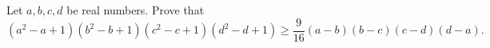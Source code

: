 Let $a,b,c,d$ be real numbers. Prove that
$$(a^2-a+1)(b^2-b+1)(c^2-c+1)(d^2-d+1) \ge \frac{9}{16} (a-b)(b-c)(c-d)(d-a).$$
